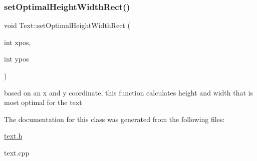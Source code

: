 \subsubsection{\texorpdfstring{set\+Optimal\+Height\+Width\+Rect()}{setOptimalHeightWidthRect()}}
{\footnotesize\ttfamily void Text\+::set\+Optimal\+Height\+Width\+Rect (\begin{DoxyParamCaption}\item[{int}]{xpos,  }\item[{int}]{ypos }\end{DoxyParamCaption})}

based on an x and y coordinate, this function calculates height and width that is most optimal for the text 

The documentation for this class was generated from the following files\+:\begin{DoxyCompactItemize}
\item 
\hyperlink{text_8h}{text.\+h}\item 
text.\+cpp\end{DoxyCompactItemize}
